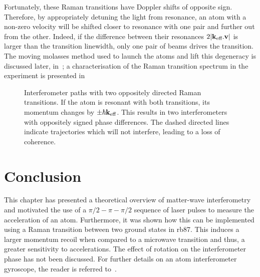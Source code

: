 Fortunately, these Raman transitions have Doppler shifts of
opposite sign. Therefore, by appropriately detuning the light from
resonance, an atom with a non-zero velocity will be shifted closer to
resonance with one pair and further out from the other. Indeed, if
the difference between their resonances $2 |{\textbf k_\textnormal{eff}}.\textbf{v}|$ is
larger than the transition linewidth, only one pair of beams drives
the transition. The moving molasses method used to launch the atoms
and lift this degeneracy is
discussed later, in~; a characterisation of the Raman
transition spectrum in the experiment is presented
in~ 
\begin{figure}[htpb]
  \centering
  \fontsize{18pt}{18pt}
  \resizebox{0.4\textwidth}{!}{}
  \caption[Interferometer paths with two oppositely directed Raman
  transitions.]{Interferometer paths with two oppositely directed Raman
  transitions. If the atom is resonant with both transitions, its
momentum changes by $\pm \hbar {\textbf k_\textnormal{eff}}$. This results in two
interferometers with oppositely signed phase differences. The dashed
directed lines indicate trajectories which will not interfere, leading
to a loss of coherence.}
\label{fig:double_int_path}
\end{figure}


\section{Conclusion}
This chapter has presented a theoretical overview of matter-wave
interferometry and motivated the use of a $\pi/2-\pi-\pi/2$ sequence
of laser pulses to measure the acceleration of an atom. Furthermore,
it was shown how this can be implemented using a Raman transition
between two ground states in
\ac{rb87}. This induces a larger momentum recoil when compared to a
microwave transition and thus, a greater sensitivity to accelerations.
The effect of rotation on the interferometer phase has not been
discussed. For further details on an atom interferometer gyroscope,
the reader is referred to~\cite{Gauguet2009}.
\nocite{Dubetsky2006}
\nocite{Han2012}

